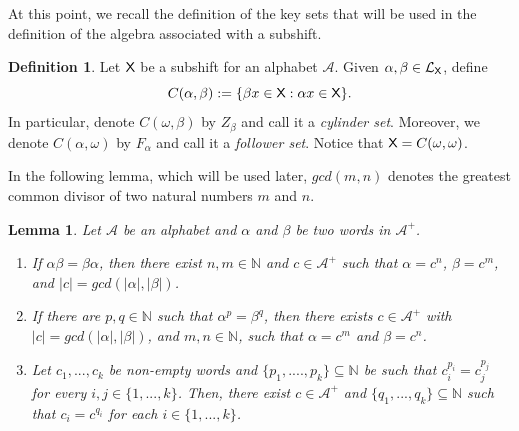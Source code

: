 \documentclass[a4paper,12pt]{amsart}
\newtheorem{lemma}[equation]{Lemma}
\theoremstyle{definition}
\newtheorem{definition}[equation]{Definition}
\theoremstyle{remark}
\numberwithin{equation}{section}
\newcommand{\osf}{{\normalfont \textsf{X}}}
\newcommand{\lang}{\CL_{\osf}}
\newcommand{\alf}{\mathscr{A}}
\newcommand{\N}{\mathbb{N}}
\newcommand{\CL}{\mathcal{L}}
\newcommand{\eword}{\omega}
\begin{document}
At this point, we recall the definition of the key sets that will be used in the definition of the algebra associated with a subshift.

\begin{definition}\label{Arapaima}
Let $\osf$ be a subshift for an alphabet $\alf$. Given $\alpha,\beta\in \lang$, define \[C(\alpha,\beta):=\{\beta x\in\osf:\alpha x\in\osf\}.\] In particular, denote $C(\eword,\beta)$ by $Z_{\beta}$ and call it a \emph{cylinder set}. Moreover, we denote $C(\alpha,\eword)$ by $F_{\alpha}$ and call it a \emph{follower set}. Notice that $\osf=C(\eword,\eword)$.
\end{definition}


In the following lemma, which will be used later, $gcd(m,n)$ denotes the greatest common divisor of two natural numbers $m$ and $n$.

\begin{lemma}\label{gcd1}  Let $\alf$ be an alphabet and $\alpha$ and $\beta$ be two words in $\alf^+$.
\begin{enumerate}[\hspace{.3cm} \rm (1)]
\item If $\alpha\beta=\beta\alpha$, then there exist $n,m\in \N$ and  $c\in \alf^+$ such that $\alpha = c^n$, $\beta=c^m$, and $|c|=gcd(|\alpha|,|\beta|)$. 
\item If there are $p,q\in \N$ such that $\alpha^p=\beta^q$, then there exists $c\in\alf^+$ with $|c|=gcd(|\alpha|, |\beta|)$, and $m,n\in \N$, such that   $\alpha=c^m$ and $\beta=c^n$.

\item Let $c_1,...,c_k$ be non-empty words and $\{p_1,....,p_k\}\subseteq \N$ be such that $c_i^{p_i}=c_j^{p_j}$ for every $i,j\in \{1,...,k\}$. Then, there exist $c\in\alf^+$ and $\{q_1,...,q_k\} \subseteq \N $ such that $c_i=c^{q_i}$ for each $i\in \{1,...,k\}$.
\end{enumerate}

\end{lemma}
\end{document}
